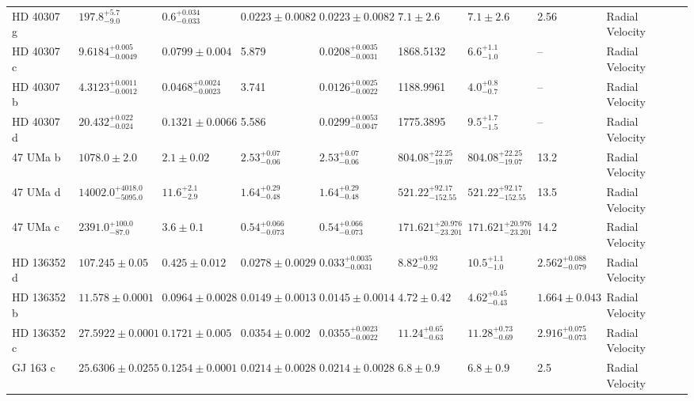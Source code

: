 \begin{tabular}{llllllllll}
HD 40307 g & $197.8^{+5.7}_{-9.0}$ & $0.6^{+0.034}_{-0.033}$ & $0.0223 \pm 0.0082$ & $0.0223 \pm 0.0082$ & $7.1 \pm 2.6$ & $7.1 \pm 2.6$ & 2.56 & Radial Velocity & \cite{TUOMI_ET_AL__2013} \\
HD 40307 c & $9.6184^{+0.005}_{-0.0049}$ & $0.0799 \pm 0.004$ & 5.879 & $0.0208^{+0.0035}_{-0.0031}$ & 1868.5132 & $6.6^{+1.1}_{-1.0}$ & -- & Radial Velocity & \cite{TUOMI_ET_AL__2013} \\
HD 40307 b & $4.3123^{+0.0011}_{-0.0012}$ & $0.0468^{+0.0024}_{-0.0023}$ & 3.741 & $0.0126^{+0.0025}_{-0.0022}$ & 1188.9961 & $4.0^{+0.8}_{-0.7}$ & -- & Radial Velocity & \cite{TUOMI_ET_AL__2013} \\
HD 40307 d & $20.432^{+0.022}_{-0.024}$ & $0.1321 \pm 0.0066$ & 5.586 & $0.0299^{+0.0053}_{-0.0047}$ & 1775.3895 & $9.5^{+1.7}_{-1.5}$ & -- & Radial Velocity & \cite{TUOMI_ET_AL__2013} \\
47 UMa b & $1078.0 \pm 2.0$ & $2.1 \pm 0.02$ & $2.53^{+0.07}_{-0.06}$ & $2.53^{+0.07}_{-0.06}$ & $804.08^{+22.25}_{-19.07}$ & $804.08^{+22.25}_{-19.07}$ & 13.2 & Radial Velocity & \cite{GREGORY___FISCHER_2010} \\
47 UMa d & $14002.0^{+4018.0}_{-5095.0}$ & $11.6^{+2.1}_{-2.9}$ & $1.64^{+0.29}_{-0.48}$ & $1.64^{+0.29}_{-0.48}$ & $521.22^{+92.17}_{-152.55}$ & $521.22^{+92.17}_{-152.55}$ & 13.5 & Radial Velocity & \cite{GREGORY___FISCHER_2010} \\
47 UMa c & $2391.0^{+100.0}_{-87.0}$ & $3.6 \pm 0.1$ & $0.54^{+0.066}_{-0.073}$ & $0.54^{+0.066}_{-0.073}$ & $171.621^{+20.976}_{-23.201}$ & $171.621^{+20.976}_{-23.201}$ & 14.2 & Radial Velocity & \cite{GREGORY___FISCHER_2010} \\
HD 136352 d & $107.245 \pm 0.05$ & $0.425 \pm 0.012$ & $0.0278 \pm 0.0029$ & $0.033^{+0.0035}_{-0.0031}$ & $8.82^{+0.93}_{-0.92}$ & $10.5^{+1.1}_{-1.0}$ & $2.562^{+0.088}_{-0.079}$ & Radial Velocity & \cite{DELREZ_ET_AL_2021} \\
HD 136352 b & $11.578 \pm 0.0001$ & $0.0964 \pm 0.0028$ & $0.0149 \pm 0.0013$ & $0.0145 \pm 0.0014$ & $4.72 \pm 0.42$ & $4.62^{+0.45}_{-0.43}$ & $1.664 \pm 0.043$ & Radial Velocity & \cite{DELREZ_ET_AL_2021} \\
HD 136352 c & $27.5922 \pm 0.0001$ & $0.1721 \pm 0.005$ & $0.0354 \pm 0.002$ & $0.0355^{+0.0023}_{-0.0022}$ & $11.24^{+0.65}_{-0.63}$ & $11.28^{+0.73}_{-0.69}$ & $2.916^{+0.075}_{-0.073}$ & Radial Velocity & \cite{DELREZ_ET_AL_2021} \\
GJ 163 c & $25.6306 \pm 0.0255$ & $0.1254 \pm 0.0001$ & $0.0214 \pm 0.0028$ & $0.0214 \pm 0.0028$ & $6.8 \pm 0.9$ & $6.8 \pm 0.9$ & 2.5 & Radial Velocity & \cite{BONFILS_ET_AL__2013} \\

\end{tabular}
